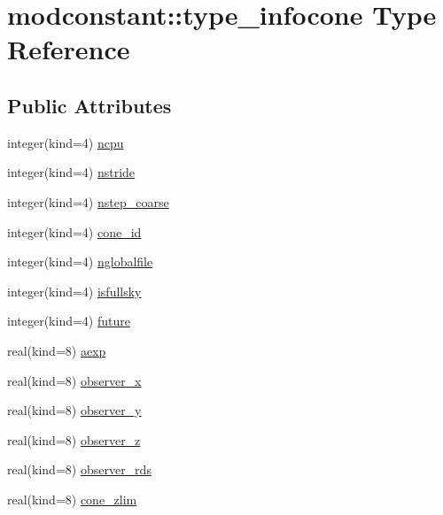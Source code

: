 \hypertarget{structmodconstant_1_1type__infocone}{\section{modconstant\-:\-:type\-\_\-infocone Type Reference}
\label{structmodconstant_1_1type__infocone}
}
\subsection*{Public Attributes}
\begin{DoxyCompactItemize}
\item 
integer(kind=4) \hyperlink{structmodconstant_1_1type__infocone_a2085f6dfc0dfa44c312c1f92021a08c3}{ncpu}
\item 
integer(kind=4) \hyperlink{structmodconstant_1_1type__infocone_a0518cd3191a67331de40dd13f19345b0}{nstride}
\item 
integer(kind=4) \hyperlink{structmodconstant_1_1type__infocone_aa36e3d7e8b1cfd9a111b897917567ad5}{nstep\-\_\-coarse}
\item 
integer(kind=4) \hyperlink{structmodconstant_1_1type__infocone_aef4e47022a667b8d2dad299fe132fd5c}{cone\-\_\-id}
\item 
integer(kind=4) \hyperlink{structmodconstant_1_1type__infocone_a08b0aed7e8b71197bd6f73439a343883}{nglobalfile}
\item 
integer(kind=4) \hyperlink{structmodconstant_1_1type__infocone_adb5bd3dc9f5e4b1ed2b0b10b14c7fe23}{isfullsky}
\item 
integer(kind=4) \hyperlink{structmodconstant_1_1type__infocone_a1fcb4dfca22f5cdb9979317636506751}{future}
\item 
real(kind=8) \hyperlink{structmodconstant_1_1type__infocone_ac3a5d891e4c144a6391de4445dd2e675}{aexp}
\item 
real(kind=8) \hyperlink{structmodconstant_1_1type__infocone_af67a9e1949f9edead87e1c7bce004c5c}{observer\-\_\-x}
\item 
real(kind=8) \hyperlink{structmodconstant_1_1type__infocone_a2b4f02168657948cb408c35f98263029}{observer\-\_\-y}
\item 
real(kind=8) \hyperlink{structmodconstant_1_1type__infocone_a05bd00def00e396390e75c97d9e171b8}{observer\-\_\-z}
\item 
real(kind=8) \hyperlink{structmodconstant_1_1type__infocone_a5ce5f0baded3372b6802b32a689cf571}{observer\-\_\-rds}
\item 
real(kind=8) \hyperlink{structmodconstant_1_1type__infocone_ae9da46dfd6bb0ce1670e30f549e35b96}{cone\-\_\-zlim}

\end{DoxyCompactItemize}
